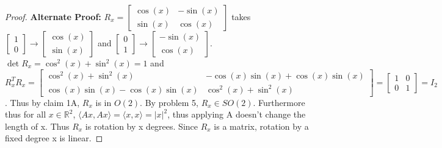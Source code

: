 \documentclass{article}
\newcommand{\R}{\mathbb{R}}
\newcommand{\abs}[1]{\lvert #1\rvert}
\newcommand{\angles}[1]{\langle{#1}\rangle}
\begin{document}
\begin{proof}
    \textbf{Alternate Proof: } $R_x = \begin{bmatrix}
        \cos(x) & -\sin(x) \\
        \sin(x) & \cos(x)
    \end{bmatrix}$ takes $\begin{bmatrix}
        1 \\ 0
    \end{bmatrix} \to \begin{bmatrix}
        \cos(x) \\ \sin(x)
    \end{bmatrix}$ and $\begin{bmatrix}
        0 \\ 1
    \end{bmatrix} \to \begin{bmatrix}
        -\sin(x) \\ \cos(x)
    \end{bmatrix}$. $\det R_x = \cos^2(x) + \sin^2(x) = 1$ and $R_x^T R_x = \begin{bmatrix}
        \cos^2(x) + \sin^2(x) & -\cos(x)\sin(x) +  \cos(x)\sin(x) \\
        \cos(x)\sin(x) -\cos(x)\sin(x) & \cos^2(x) + \sin^2(x)
    \end{bmatrix} = \begin{bmatrix}
        1 & 0 \\ 0 & 1
    \end{bmatrix} = I_2$. Thus by claim 1A, $R_x$ is in $O(2)$. By problem 5, $R_x \in SO(2)$. Furthermore thus for all $x \in \R^2$, $\angles{Ax ,Ax} = \angles{x ,x} = \abs{x}^2$, thus applying A doesn't change the length of x. Thus $R_x$ is rotation by x degrees. Since $R_x$ is a matrix, rotation by a fixed degree x is linear.
\end{proof}
\end{document}
